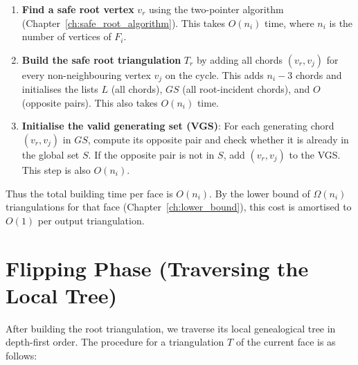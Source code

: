 \begin{enumerate}
    \item \textbf{Find a safe root vertex} \(v_r\) using the two-pointer algorithm (Chapter~\ref{ch:safe_root_algorithm}). 
    This takes \(O(n_i)\) time, where \(n_i\) is the number of vertices of \(F_i\).
    
    \item \textbf{Build the safe root triangulation} \(T_r\) by adding all chords \((v_r, v_j)\) for every non-neighbouring vertex \(v_j\) on the cycle. 
    This adds \(n_i-3\) chords and initialises the lists \(L\) (all chords), \(GS\) (all root-incident chords), and \(O\) (opposite pairs). 
    This also takes \(O(n_i)\) time.
    
    \item \textbf{Initialise the valid generating set (VGS)}: 
    For each generating chord \((v_r, v_j)\) in \(GS\), compute its opposite pair and check whether it is already in the global set \(S\). 
    If the opposite pair is not in \(S\), add \((v_r, v_j)\) to the VGS. 
    This step is also \(O(n_i)\).
\end{enumerate}

Thus the total building time per face is \(O(n_i)\). 
By the lower bound of \(\Omega(n_i)\) triangulations for that face (Chapter~\ref{ch:lower_bound}), this cost is amortised to \(O(1)\) per output triangulation.

\section{Flipping Phase (Traversing the Local Tree)}
\label{sec:flipping_phase}

After building the root triangulation, we traverse its local genealogical tree in depth-first order. 
The procedure for a triangulation \(T\) of the current face is as follows:

